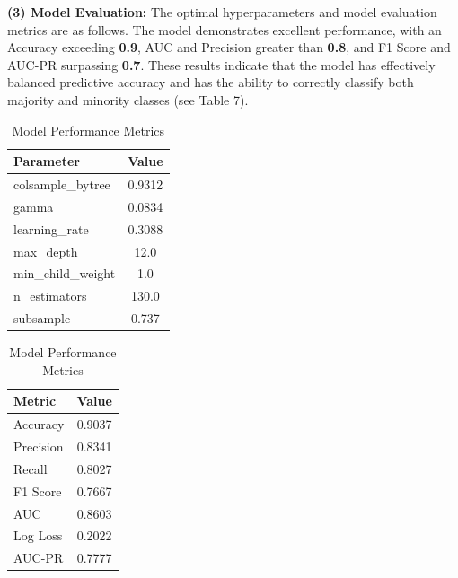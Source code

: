 \documentclass[12pt]{article}  %
\begin{document}
\begin{enumerate}[\textbullet]
\textbf{(3) Model Evaluation:} The optimal hyperparameters and model evaluation metrics are as follows. The model demonstrates excellent performance, with an Accuracy exceeding \textbf{0.9}, AUC and Precision greater than \textbf{0.8}, and F1 Score and AUC-PR surpassing \textbf{0.7}. These results indicate that the model has effectively balanced predictive accuracy and has the ability to correctly classify both majority and minority classes (see Table 7).

    \begin{table}[h]
    \centering
    \caption{Model Hyper-parameters and Performance Metrics}
    \begin{subtable}{0.5\textwidth}
    \centering
    \caption{Model Hyper-parameters}
    \begin{tabular}{lc}
    \toprule
    \textbf{Parameter} & \textbf{Value} \\
    \midrule
    colsample\_bytree & 0.9312 \\
    gamma & 0.0834 \\
    learning\_rate & 0.3088 \\
    max\_depth & 12.0 \\
    min\_child\_weight & 1.0 \\
    n\_estimators & 130.0 \\
    subsample & 0.737 \\
    \bottomrule
    \end{tabular}
    \end{subtable}%
    \hfill %
    \begin{subtable}{0.5\textwidth}
    \centering
    \caption{Model Performance Metrics}
    \begin{tabular}{lc}
    \toprule
    \textbf{Metric} & \textbf{Value} \\
    \midrule
    Accuracy & 0.9037 \\
    Precision & 0.8341 \\
    Recall & 0.8027 \\
    F1 Score & 0.7667 \\
    AUC & 0.8603 \\
    Log Loss & 0.2022 \\
    AUC-PR & 0.7777 \\
    \bottomrule
    \end{tabular}
    \end{subtable}
    \end{table}

\end{enumerate}
\end{document}
